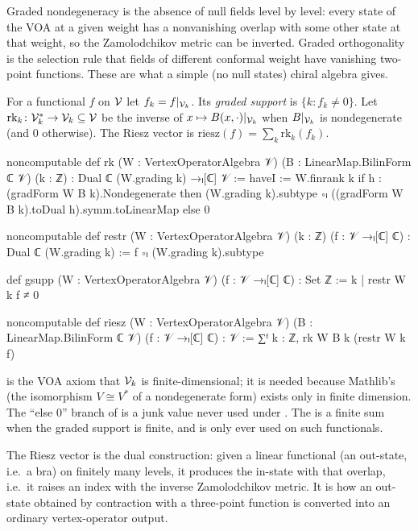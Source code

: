 \begin{physics}
Graded nondegeneracy is the absence of null fields level by level: every state of the VOA at a given weight has a nonvanishing overlap with some other state at that weight, so the Zamolodchikov metric can be inverted. Graded orthogonality is the selection rule that fields of different conformal weight have vanishing two-point functions. These are what a simple (no null states) chiral algebra gives.
\end{physics}

\begin{definition}\label{ch09:def:riesz}
For a functional $f$ on $\mathcal{V}$ let $f_k=f|_{\mathcal{V}_k}$. Its \emph{graded support} is
$\{k:f_k\neq0\}$. Let $\mathrm{rk}_k\colon\mathcal{V}_k^*\to\mathcal{V}_k\subseteq\mathcal{V}$ be the inverse
of $x\mapsto B(x,\cdot)|_{\mathcal{V}_k}$ when $B|_{\mathcal{V}_k}$ is nondegenerate (and $0$ otherwise).
The Riesz vector is $\mathrm{riesz}(f)=\sum_k\mathrm{rk}_k(f_k)$.
\end{definition}
\begin{leancode}
noncomputable def rk (W : VertexOperatorAlgebra 𝒱) (B : LinearMap.BilinForm ℂ 𝒱) (k : ℤ) :
    Dual ℂ (W.grading k) →ₗ[ℂ] 𝒱 :=
  haveI := W.finrank k
  if h : (gradForm W B k).Nondegenerate then
    (W.grading k).subtype ∘ₗ ((gradForm W B k).toDual h).symm.toLinearMap
  else 0

noncomputable def restr (W : VertexOperatorAlgebra 𝒱) (k : ℤ) (f : 𝒱 →ₗ[ℂ] ℂ) :
    Dual ℂ (W.grading k) :=
  f ∘ₗ (W.grading k).subtype

def gsupp (W : VertexOperatorAlgebra 𝒱) (f : 𝒱 →ₗ[ℂ] ℂ) : Set ℤ := {k | restr W k f ≠ 0}

noncomputable def riesz (W : VertexOperatorAlgebra 𝒱) (B : LinearMap.BilinForm ℂ 𝒱)
    (f : 𝒱 →ₗ[ℂ] ℂ) : 𝒱 :=
  ∑ᶠ k : ℤ, rk W B k (restr W k f)
\end{leancode}
\begin{dictionary}
 is the VOA axiom that $\mathcal{V}_k$ is finite-dimensional; it is needed because
Mathlib's  (the isomorphism $V\cong V^*$ of a nondegenerate form) exists only in finite
dimension. The ``else 0'' branch of  is a junk value never used under
. The  is a finite sum when the graded support is finite, and
 is only ever used on such functionals.
\end{dictionary}

\begin{physics}
The Riesz vector is the dual construction: given a linear functional (an out-state, i.e.\ a bra) on finitely many levels, it produces the in-state with that overlap, i.e.\ it raises an index with the inverse Zamolodchikov metric. It is how an out-state obtained by contraction with a three-point function is converted into an ordinary vertex-operator output.
\end{physics}

